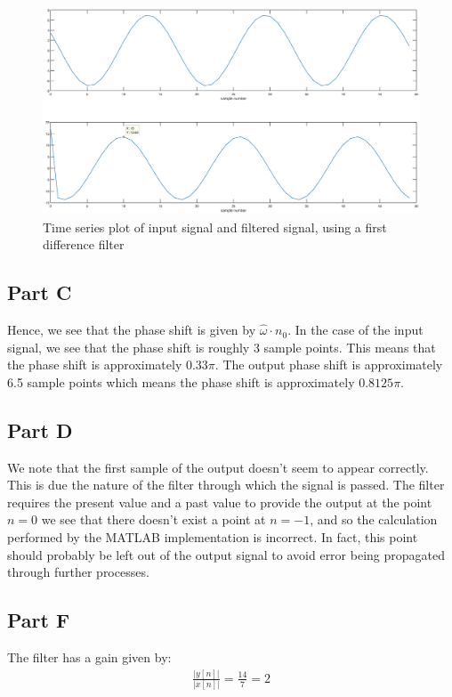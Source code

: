 \documentclass{article}
\begin{document}
\begin{figure}[H]
	\centering
	\includegraphics[scale = 0.3]{fig3}
	\caption{Time series plot of input signal and filtered signal, using a first difference filter}
\end{figure}

\subsection{Part C}
Hence, we see that the phase shift is given by $\hat{\omega} \cdot n_0$. In the case of the input signal, we see that the phase shift is roughly 3 sample points. This means that the phase shift is approximately $0.33 \pi$. The output phase shift is approximately 6.5 sample points which means the phase shift is approximately $0.8125 \pi$.

\subsection{Part D}
We note that the first sample of the output doesn't seem to appear correctly. This is due the nature of the filter through which the signal is passed. The filter requires the present value and a past value to provide the output at the point $n = 0$ we see that there doesn't exist a point at $n=-1$, and so the calculation performed by the MATLAB implementation is incorrect. In fact, this point should probably be left out of the output signal to avoid error being propagated through further processes.

\subsection{Part F}
The filter has a gain given by:
\begin{align*}
	\frac{|y[n]|}{|x[n]|} = \frac{14}{7} = 2
\end{align*}
\end{document}
